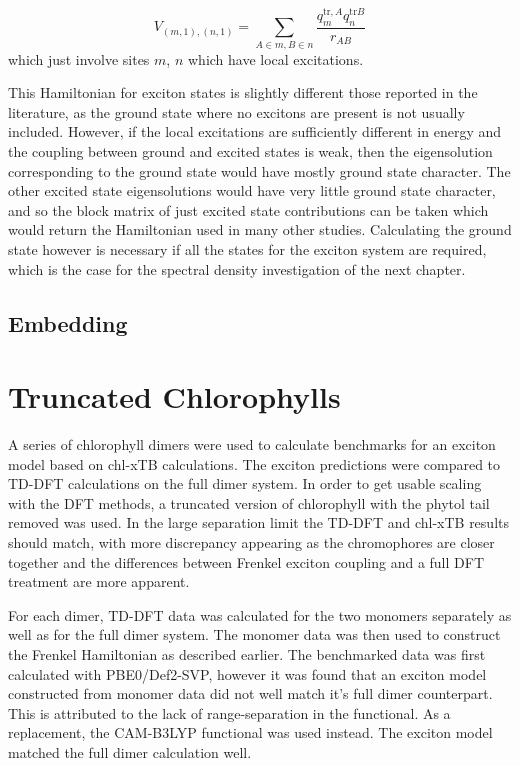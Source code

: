 \begin{equation}
    V_{\left(m, 1\right), \left(n,1\right)} = \sum_{A \in m, B \in n} \frac{q^{\text{tr},A}_m q^{\text{tr}B}_n}{r_{AB}}
\end{equation}
%
which just involve sites $m$, $n$ which have local excitations.

This Hamiltonian for exciton states is slightly different those reported in the 
literature, as the ground state where no excitons are present is not usually included.
However, if the local excitations are sufficiently different in energy and the coupling
between ground and excited states is weak, then the eigensolution corresponding 
to the ground state would have mostly ground state character. The other excited
state eigensolutions would have very little ground state character, and so the block
matrix of just excited state contributions can be taken which would return the Hamiltonian
used in many other studies. Calculating the ground state however is necessary if
all the states for the exciton system are required, which is the case for the
spectral density investigation of the next chapter.

\subsection{Embedding}
\label{subsec:embedding}



\section{Truncated Chlorophylls}
\label{sec:trunc_chl}

A series of chlorophyll dimers were used to calculate benchmarks for an exciton
model based on chl-xTB calculations. The exciton predictions were compared to TD-DFT
calculations on the full dimer system. In order to get usable scaling with the DFT
methods, a truncated version of chlorophyll with the phytol tail removed was used.
In the large separation limit the TD-DFT and chl-xTB results should match, with
more discrepancy appearing as the chromophores are closer together and the differences
between Frenkel exciton coupling and a full DFT treatment are more apparent.

For each dimer, TD-DFT data was calculated for the two monomers separately as well
as for the full dimer system. The monomer data was then used to construct the Frenkel
Hamiltonian as described earlier.
The benchmarked data was first calculated with PBE0/Def2-SVP, however it was found 
that an exciton model constructed from monomer data did not well match it's full 
dimer counterpart. This is attributed to the lack of range-separation in the
functional.
As a replacement, the CAM-B3LYP functional was used instead. The exciton model matched
the full dimer calculation well.

